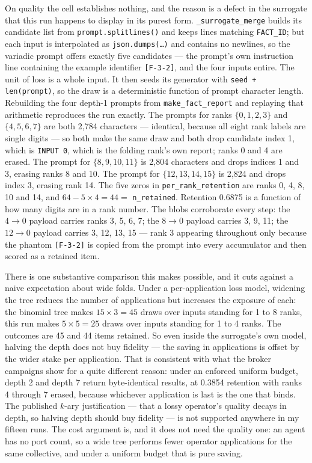 \documentclass[11pt]{article}
\begin{document}
On quality the cell establishes nothing, and the reason is a defect in the surrogate that
this run happens to display in its purest form. \texttt{\_surrogate\_merge} builds its
candidate list from \texttt{prompt.splitlines()} and keeps lines matching
\texttt{FACT\_ID}; but each input is interpolated as \texttt{json.dumps(\dots)} and contains
no newlines, so the variadic prompt offers exactly five candidates --- the prompt's own
instruction line containing the example identifier \texttt{[F-3-2]}, and the four inputs
entire. The unit of loss is a whole input. It then seeds its generator with
\texttt{seed + len(prompt)}, so the draw is a deterministic function of prompt character
length. Rebuilding the four depth-1 prompts from \texttt{make\_fact\_report} and replaying
that arithmetic reproduces the run exactly. The prompts for ranks $\{0,1,2,3\}$ and
$\{4,5,6,7\}$ are both 2{,}784 characters --- identical, because all eight rank labels are
single digits --- so both make the same draw and both drop candidate index 1, which is
\texttt{INPUT 0}, which is the folding rank's own report; ranks 0 and 4 are erased. The
prompt for $\{8,9,10,11\}$ is 2{,}804 characters and drops indices 1 and 3, erasing ranks 8
and 10. The prompt for $\{12,13,14,15\}$ is 2{,}824 and drops index 3, erasing rank 14. The
five zeros in \texttt{per\_rank\_retention} are ranks 0, 4, 8, 10 and 14, and
$64 - 5\times4 = 44 = $ \texttt{n\_retained}. Retention 0.6875 is a function of how many
digits are in a rank number. The blobs corroborate every step: the $4\to0$ payload carries
ranks 3, 5, 6, 7; the $8\to0$ payload carries 3, 9, 11; the $12\to0$ payload carries 3, 12,
13, 15 --- rank 3 appearing throughout only because the phantom \texttt{[F-3-2]} is copied
from the prompt into every accumulator and then scored as a retained item.

There is one substantive comparison this makes possible, and it cuts against a naive
expectation about wide folds. Under a per-application loss model, widening the tree reduces
the number of applications but increases the exposure of each: the binomial tree makes
$15\times3 = 45$ draws over inputs standing for 1 to 8 ranks, this run makes $5\times5 = 25$
draws over inputs standing for 1 to 4 ranks. The outcomes are 45 and 44 items retained.
So even inside the surrogate's own model, halving the depth does not buy fidelity --- the
saving in applications is offset by the wider stake per application. That is consistent with
what the broker campaigns show for a quite different reason: under an enforced uniform
budget, depth 2 and depth 7 return byte-identical results, at 0.3854 retention with ranks 4
through 7 erased, because whichever application is last is the one that binds. The published
$k$-ary justification --- that a lossy operator's quality decays in depth, so halving depth
should buy fidelity --- is not supported anywhere in my fifteen runs. The cost argument is,
and it does not need the quality one: an agent has no port count, so a wide tree performs
fewer operator applications for the same collective, and under a uniform budget that is pure
saving.
\end{document}

